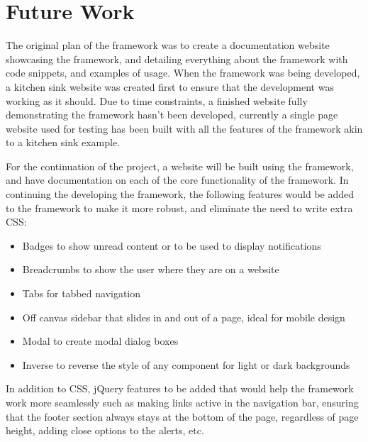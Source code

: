 \newpage
\chapter*{Future Work}


The original plan of the framework was to create a documentation website showcasing the framework, and detailing everything about the framework with code snippets, and examples of usage. When the framework was being developed, a kitchen sink website was created first to ensure that the development was working as it should. Due to time constraints, a finished website fully demonstrating the framework hasn't been developed, currently a single page website used for testing has been built with all the features of the framework akin to a kitchen sink example. 

For the continuation of the project, a website will be built using the framework, and have documentation on each of the core functionality of the framework. In continuing the developing the framework, the following features would be added to the framework to make it more robust, and eliminate the need to write extra \gls{CSS}:
\begin{itemize}
	\item Badges to show unread content or to be used to display notifications
	\item Breadcrumbs to show the user where they are on a website
	\item Tabs for tabbed navigation
	\item Off canvas sidebar that slides in and out of a page, ideal for mobile design
	\item Modal to create modal dialog boxes
	\item Inverse to reverse the style of any component for light or dark backgrounds
\end{itemize}

In addition to \gls{CSS}, jQuery features to be added that would help the framework work more seamlessly such as making links active in the navigation bar, ensuring that the footer section always stays at the bottom of the page, regardless of page height, adding close options to the alerts, etc. 

%
%

